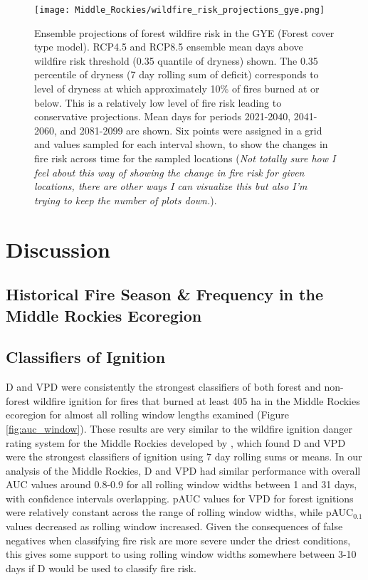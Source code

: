 \documentclass[11pt]{article}
\begin{document}
\begin{figure}
  \centering
  \texttt{[image: Middle\_Rockies/wildfire\_risk\_projections\_gye.png]}
  \caption{Ensemble projections of forest wildfire risk in the GYE (Forest cover type model).  RCP4.5 and RCP8.5 ensemble mean days above wildfire risk threshold (0.35 quantile of dryness) shown.  The 0.35 percentile of dryness (7 day rolling sum of deficit) corresponds to level of dryness at which approximately 10\% of fires burned at or below.  This is a relatively low level of fire risk leading to conservative projections.  Mean days for periods 2021-2040, 2041-2060, and 2081-2099 are shown.  Six points were assigned in a grid and values sampled for each interval shown, to show the changes in fire risk across time for the sampled locations (\textit{Not totally sure how I feel about this way of showing the change in fire risk for given locations, there are other ways I can visualize this but also I'm trying to keep the number of plots down.}).}
  \label{fig:projected-risk}
\end{figure}

\section{Discussion}
\subsection{Historical Fire Season \& Frequency in the Middle Rockies Ecoregion}
\subsection{Classifiers of Ignition}
D and VPD were consistently the strongest classifiers of both forest and non-forest wildfire ignition for fires that burned at least 405 ha in the Middle Rockies ecoregion for almost all rolling window lengths examined (Figure \ref{fig:auc_window}).  These results are very similar to the wildfire ignition danger rating system for the Middle Rockies developed by , which found D and VPD were the strongest classifiers of ignition using 7 day rolling sums or means.  In our analysis of the Middle Rockies, D and VPD had similar performance with overall AUC values around 0.8-0.9 for all rolling window widths between 1 and 31 days, with confidence intervals overlapping.  pAUC values for VPD for forest ignitions were relatively constant across the range of rolling window widths, while pAUC$_{0.1}$ values decreased as rolling window increased.  Given the consequences of false negatives when classifying fire risk are more severe under the driest conditions, this gives some support to using rolling window widths somewhere between 3-10 days if D would be used to classify fire risk.
\end{document}
